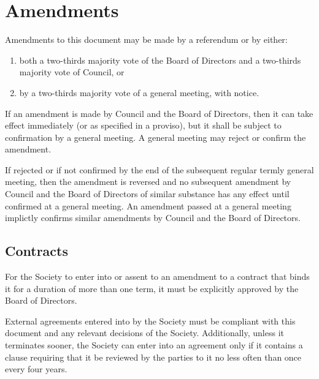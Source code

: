 \section{Amendments}
Amendments to this document may be made by a referendum or by either:
\begin{enumerate}
    \item both a two-thirds majority vote of the Board of Directors and a
      two-thirds majority vote of Council, or 
    \item by a two-thirds majority vote of a general meeting, with notice.
\end{enumerate}

If an amendment is made by Council and the Board of Directors, then it can take
effect immediately (or as specified in a proviso), but it shall be subject to
confirmation by a general meeting. A general meeting may reject or confirm the
amendment. 

If rejected or if not confirmed by the end of the subsequent regular termly
general meeting, then the amendment is reversed and no subsequent amendment by
Council and the Board of Directors of similar substance has any effect until
confirmed at a general meeting. An amendment passed at a general meeting
implictly confirms similar amendments by Council and the Board of Directors.

\subsection{Contracts}
For the Society to enter into or assent to an amendment to a contract
that binds it for a duration of more than one term, it must be explicitly
approved by the Board of Directors.

External agreements entered into by the Society must be compliant with this
document and any relevant decisions of the Society. Additionally, unless it
terminates sooner, the Society can enter into an agreement only if it contains
a clause requiring that it be reviewed by the parties to it no less often than
once every four years.

